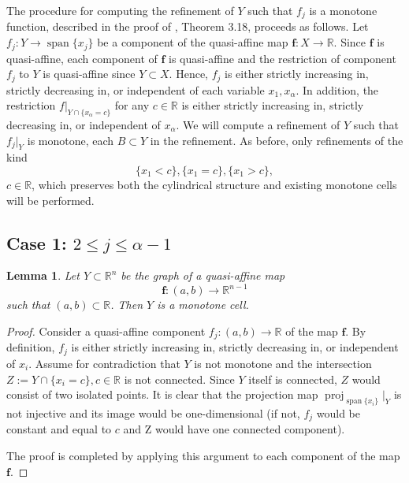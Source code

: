 \documentclass[
]{book}
\newtheorem{lemma}{Lemma}[chapter]
\theoremstyle{definition}
\theoremstyle{definition}
\theoremstyle{definition}
\theoremstyle{definition}
\theoremstyle{remark}
\begin{document}
The procedure for computing the refinement of \(Y\) such that \(f_j\) is a monotone function, described in the proof of \citet{bgv15}, Theorem 3.18, proceeds as follows.
Let \(f_j : Y \to {\operatorname{span} \{x_j\}}\) be a component of the quasi-affine map \(\mathbf{f} : X \to \mathbb{R}\). Since \(\mathbf{f}\) is quasi-affine, each component of \(\mathbf{f}\) is quasi-affine and the restriction of component \(f_j\) to \(Y\) is quasi-affine since \(Y \subset X\).
Hence, \(f_j\) is either strictly increasing in, strictly decreasing in, or independent of each variable \(x_1, x_\alpha\).
In addition, the restriction \(f\vert_{Y \cap \{x_\alpha = c\}}\) for any \(c \in \mathbb{R}\) is either strictly increasing in, strictly decreasing in, or independent of \(x_\alpha\).
We will compute a refinement of \(Y\) such that \(f_j\vert_Y\) is monotone, each \(B \subset Y\) in the refinement.
As before, only refinements of the kind
\[
\{ x_1 < c \}, \{ x_1 = c \}, \{ x_1 > c \},
\]
\(c \in \mathbb{R}\), which preserves both the cylindrical structure and existing monotone cells will be performed.

\hypertarget{case-1-2-le-j-le-alpha---1}{%
\subsection{\texorpdfstring{Case 1: \(2 \le j \le \alpha - 1\)}{Case 1: 2 \textbackslash le j \textbackslash le \textbackslash alpha - 1}}\label{case-1-2-le-j-le-alpha---1}}

\begin{lemma}
\protect\hypertarget{lem:one-dim-qa-is-monotone}{}\label{lem:one-dim-qa-is-monotone}Let \(Y \subset \mathbb{R}^n\) be the graph of a quasi-affine map
\[
\mathbf{f} : (a,b) \to \mathbb{R}^{n-1}
\]
such that \((a,b) \subset \mathbb{R}\). Then \(Y\) is a monotone cell.
\end{lemma}

\begin{proof}
Consider a quasi-affine component \(f_j : (a,b) \to \mathbb{R}\) of the map \(\mathbf{f}\). By definition, \(f_j\) is either strictly increasing in, strictly decreasing in, or independent of \(x_i\). Assume for contradiction that \(Y\) is not monotone and the intersection \(Z := Y \cap \{ x_i = c \}, c \in \mathbb{R}\) is not connected. Since \(Y\) itself is connected, \(Z\) would consist of two isolated points. It is clear that the projection map \({\operatorname{proj}_{{\operatorname{span} \{x_i\}}}}\vert_Y\) is not injective and its image would be one-dimensional (if not, \(f_j\) would be constant and equal to \(c\) and Z would have one connected component).

The proof is completed by applying this argument to each component of the map \(\mathbf{f}\).
\end{proof}
\end{document}
